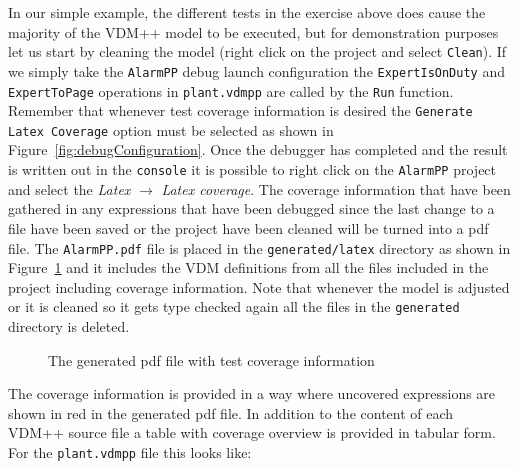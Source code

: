 In our simple example, the different tests in the exercise above does
cause the majority of the VDM++ model to be executed, but for
demonstration purposes let us start by cleaning the model (right click
on the project and select \texttt{Clean}). If we simply take the
\texttt{AlarmPP} debug launch configuration the
\verb|ExpertIsOnDuty| and \verb|ExpertToPage| operations in 
\verb|plant.vdmpp| are called by the
\texttt{Run} function. Remember that whenever test coverage
information is desired the \texttt{Generate Latex Coverage} option
must be selected as shown in Figure~\ref{fig:debugConfiguration}. 
Once the debugger has completed and the result
is written out in the \texttt{console} it is possible to right click
on the \texttt{AlarmPP} project and select the \emph{Latex} $
\rightarrow $ \emph{Latex coverage}. The coverage information that have
been gathered in any expressions that have been debugged since the
last change to a file have been saved or the project have been cleaned
will be turned into a pdf file. The \texttt{AlarmPP.pdf} file is
placed in the \texttt{generated/latex} directory as shown in
Figure~\ref{fig:testcov} and it includes the
VDM definitions from all the files included in the project including
coverage information. Note that whenever the model is adjusted or it
is cleaned so it gets type checked again all the files in the
\texttt{generated} directory is deleted.

\begin{figure}[tb]
\begin{center}
\end{center}
\caption{The generated pdf file with test coverage information\label{fig:testcov}}
\end{figure}

The coverage information is provided in a way where uncovered
expressions are shown in red in the generated pdf file. In addition
to the content of each VDM++ source file a table with coverage
overview is provided in tabular form. For the \texttt{plant.vdmpp}
file this looks like:

